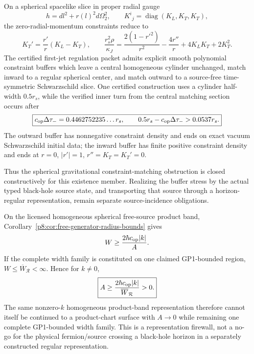\documentclass[12pt,a4paper]{article}
\begin{document}
\begin{proposition}
\label{p8:prop:v2184-spherical-constraint-buffer-matching}
On a spherical spacelike slice in proper radial gauge
\[
 h=dl^2+r(l)^2d\Omega_2^2,\qquad
 K^i{}_j=\operatorname{diag}(K_L,K_T,K_T),
\]
the zero-radial-momentum constraints reduce to
\[
 K_T'=\frac{r'}r(K_L-K_T),\qquad
 \frac{r_s^2\rho}{\kappa_J}
 =\frac{2(1-r'^2)}{r^2}-\frac{4r''}r+4K_LK_T+2K_T^2.
\]
The certified first-jet regulation packet admits explicit smooth polynomial
constraint buffers which leave a central homogeneous cylinder unchanged,
match inward to a regular spherical center, and match outward to a
source-free time-symmetric Schwarzschild slice.  One certified construction
uses a cylinder half-width \(0.5r_s\), while the verified inner turn from the
central matching section occurs after
\begin{equation}
\label{p8:eq:v2184-causal-buffer-margin}
 \boxed{c_{\rm op}\Delta\tau_-=0.4462752235\ldots r_s,\qquad
 0.5r_s-c_{\rm op}\Delta\tau_->0.0537r_s.}
\end{equation}
The outward buffer has nonnegative constraint density and ends on exact
vacuum Schwarzschild initial data; the inward buffer has finite positive
constraint density and ends at \(r=0\), \(|r'|=1\), \(r''=K_T=K_T'=0\).

Thus the spherical gravitational constraint-matching obstruction is closed
constructively for this existence member.  Realizing the buffer stress by the
actual typed black-hole source state, and transporting that source through a
horizon-regular representation, remain separate source-incidence obligations.
\end{proposition}

\begin{proposition}
\label{p8:prop:v2184-nonzero-k-product-band-horizon-firewall}
On the licensed homogeneous spherical free-source product band,
Corollary~\ref{p8:cor:free-generator-radius-bounds} gives
\[
 W\ge\frac{2\hbar c_{\rm op}|k|}{A}.
\]
If the complete width family is constituted on one claimed GP1-bounded region,
\(W\le\overline W_{\mathcal R}<\infty\).  Hence for \(k\ne0\),
\begin{equation}
\label{p8:eq:v2184-nonzero-k-product-band-horizon-firewall}
 \boxed{A\ge\frac{2\hbar c_{\rm op}|k|}{\overline W_{\mathcal R}}>0.}
\end{equation}
The same nonzero-\(k\) homogeneous product-band representation therefore
cannot itself be continued to a product-chart surface with \(A\to0\) while
remaining one complete GP1-bounded width family.  This is a representation
firewall, not a no-go for the physical fermion/source crossing a black-hole
horizon in a separately constructed regular representation.
\end{proposition}
\end{document}
